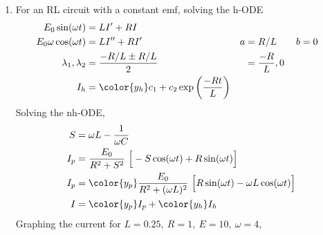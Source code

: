 \begin{enumerate}
    \item For an RL circuit with a constant emf, solving the h-ODE
          \begin{align}
              E_{0}\sin(\omega t)        & = LI' + RI                     \\
              E_{0}\omega \cos(\omega t) & = LI'' + RI'                 &
              a                          & = R/L \qquad b = 0             \\
              \lambda_{1}, \lambda_{2}   & = \frac{-R/L \pm R/L}{2}     &
                                         & = \frac{-R}{L}, 0              \\
              I_{h}                      & = {\color{y_h} c_{1} + c_{2}
              \exp\left( \frac{-Rt}{L} \right) }
          \end{align}
          Solving the nh-ODE,
          \begin{align}
              S     & = \omega L - \frac{1}{\omega C}                      \\
              I_{p} & = \frac{E_{0}}{R^{2} + S^{2}}\ \Big[-S\cos(\omega t)
              + R\sin(\omega t)\Big]                                       \\
              I_{p} & = {\color{y_p} \frac{E_{0}}{R^{2} + (\omega L)^{2}}\
              \Big[R\sin(\omega t) - \omega L \cos(\omega t)\Big]}         \\
              I     & ={\color{y_p} I_{p}} + {\color{y_h}I_{h}}
          \end{align}
          Graphing the current for $ L = 0.25,\ R = 1,\ E = 10,\ \omega = 4$,
          \begin{figure}[H]
              \centering
          \end{figure}


\end{enumerate}
